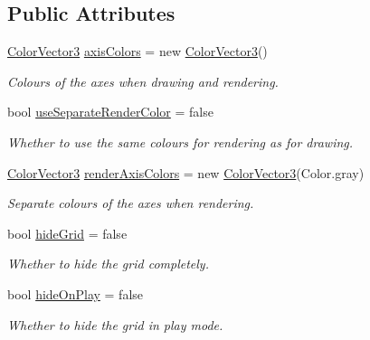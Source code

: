 \subsection*{Public Attributes}
\begin{DoxyCompactItemize}
\item 
\hyperlink{class_grid_framework_1_1_vectors_1_1_color_vector3}{Color\+Vector3} \hyperlink{class_g_f_grid_aa0dc7222dee5910e8df47e133f719309_aa0dc7222dee5910e8df47e133f719309}{axis\+Colors} = new \hyperlink{class_grid_framework_1_1_vectors_1_1_color_vector3}{Color\+Vector3}()
\begin{DoxyCompactList}\small\item\em Colours of the axes when drawing and rendering.\end{DoxyCompactList}\item 
bool \hyperlink{class_g_f_grid_aeb78dcbc2890d20556958c994b95b000_aeb78dcbc2890d20556958c994b95b000}{use\+Separate\+Render\+Color} = false
\begin{DoxyCompactList}\small\item\em Whether to use the same colours for rendering as for drawing.\end{DoxyCompactList}\item 
\hyperlink{class_grid_framework_1_1_vectors_1_1_color_vector3}{Color\+Vector3} \hyperlink{class_g_f_grid_a8a822dbae0fa74657a7beed9761a0e89_a8a822dbae0fa74657a7beed9761a0e89}{render\+Axis\+Colors} = new \hyperlink{class_grid_framework_1_1_vectors_1_1_color_vector3}{Color\+Vector3}(Color.\+gray)
\begin{DoxyCompactList}\small\item\em Separate colours of the axes when rendering.\end{DoxyCompactList}\item 
bool \hyperlink{class_g_f_grid_afa8a9e01aac581a365606ac8c1b4af64_afa8a9e01aac581a365606ac8c1b4af64}{hide\+Grid} = false
\begin{DoxyCompactList}\small\item\em Whether to hide the grid completely.\end{DoxyCompactList}\item 
bool \hyperlink{class_g_f_grid_a9a57a01347c8ab0a6401aa210f875ab0_a9a57a01347c8ab0a6401aa210f875ab0}{hide\+On\+Play} = false
\begin{DoxyCompactList}\small\item\em Whether to hide the grid in play mode.\end{DoxyCompactList}\item 

\end{DoxyCompactItemize}
